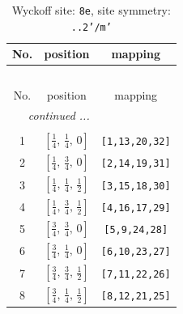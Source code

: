 \documentclass[fleqn,8pt]{jsarticle}
\begin{document}
\begin{longtable}{ccc}
\caption{Wyckoff site: {\tt 8e}, site symmetry: {\tt ..2'/m'}}
 \\
 \hline \hline
No. & position & mapping \\ \hline \endfirsthead

\multicolumn{2}{l}{\tablename\ \thetable{}} \\
 \hline \hline
No. & position & mapping \\ \hline \endhead

 \hline \hline
\multicolumn{2}{r}{\footnotesize\it continued ...} \\ \endfoot

 \hline \hline
\multicolumn{2}{r}{} \\ \endlastfoot

1 & $\left[ \frac{1}{4},\, \frac{1}{4},\, 0 \right]$ & {\tt [1,13,20,32]} \\ \hline
2 & $\left[ \frac{1}{4},\, \frac{3}{4},\, 0 \right]$ & {\tt [2,14,19,31]} \\ \hline
3 & $\left[ \frac{1}{4},\, \frac{1}{4},\, \frac{1}{2} \right]$ & {\tt [3,15,18,30]} \\ \hline
4 & $\left[ \frac{1}{4},\, \frac{3}{4},\, \frac{1}{2} \right]$ & {\tt [4,16,17,29]} \\ \hline
5 & $\left[ \frac{3}{4},\, \frac{3}{4},\, 0 \right]$ & {\tt [5,9,24,28]} \\ \hline
6 & $\left[ \frac{3}{4},\, \frac{1}{4},\, 0 \right]$ & {\tt [6,10,23,27]} \\ \hline
7 & $\left[ \frac{3}{4},\, \frac{3}{4},\, \frac{1}{2} \right]$ & {\tt [7,11,22,26]} \\ \hline
8 & $\left[ \frac{3}{4},\, \frac{1}{4},\, \frac{1}{2} \right]$ & {\tt [8,12,21,25]} \\
\end{longtable}
\renewcommand{\arraystretch}{1.2}
\end{document}
